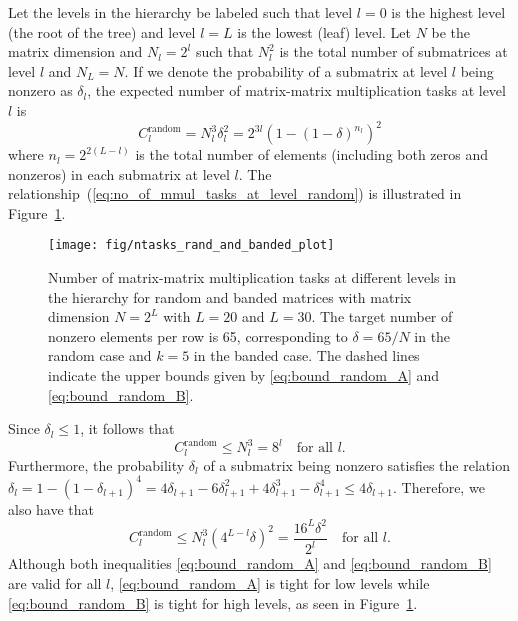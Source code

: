 \documentclass{elsarticle}
\begin{document}
Let the levels in the hierarchy be labeled such that level $l = 0$ is
the highest level (the root of the tree) and level $l = L$ is the
lowest (leaf) level.  Let $N$ be the matrix dimension and $N_l = 2^l$
such that $N_l^2$ is the total number of submatrices at level $l$ and
$N_L = N$.  If we denote the probability of a submatrix at level $l$
being nonzero as $\delta_l$, the expected number of matrix-matrix
multiplication tasks at level $l$ is
\begin{equation}\label{eq:no_of_mmul_tasks_at_level_random}
  C_l^{\mathrm{random}} = N_l^3 \delta_l^2 = 2^{3l} ( 1 - (1-\delta)^{n_l} )^2
\end{equation}
where $n_l = 2^{2(L-l)}$ is the total number of elements (including
both zeros and nonzeros) in each submatrix at level $l$.  The
relationship~(\ref{eq:no_of_mmul_tasks_at_level_random}) is
illustrated in Figure~\ref{fig:ntasks_rand_and_banded}.

\begin{figure}
  \begin{center}
    \texttt{[image: fig/ntasks\_rand\_and\_banded\_plot]}
  \end{center}
  \caption{Number of matrix-matrix multiplication tasks at different
    levels in the hierarchy for random and banded matrices with matrix
    dimension $N=2^L$ with $L=20$ and $L=30$.  The target number of
    nonzero elements per row is 65, corresponding to $\delta = 65/N$
    in the random case and $k=5$ in the banded case.  The dashed lines
    indicate the upper bounds given by \eqref{eq:bound_random_A} and
    \eqref{eq:bound_random_B}. \label{fig:ntasks_rand_and_banded}}
\end{figure}


Since $\delta_l \leq 1$, it follows that 
\begin{equation} \label{eq:bound_random_A}
  C_l^{\mathrm{random}} \leq N_l^3 = 8^l \quad \textrm{for all } l. 
\end{equation}
Furthermore, the
probability $\delta_l$ of a submatrix being nonzero satisfies the relation
$\delta_l = 1-(1-\delta_{l+1})^4 = 4\delta_{l+1}-6\delta_{l+1}^2+4\delta_{l+1}^3-\delta_{l+1}^4 \leq
4\delta_{l+1}$. Therefore, we also have that 
\begin{equation} \label{eq:bound_random_B}
  C_l^{\mathrm{random}} \leq N_l^3(4^{L-l}\delta)^2 = \frac{16^L\delta^2}{2^l} \quad \textrm{for all } l. 
\end{equation}
Although both inequalities \eqref{eq:bound_random_A} and
\eqref{eq:bound_random_B} are valid for all $l$,
\eqref{eq:bound_random_A} is tight for low levels while
\eqref{eq:bound_random_B} is tight for high levels, as seen in
Figure~\ref{fig:ntasks_rand_and_banded}.
\end{document}
